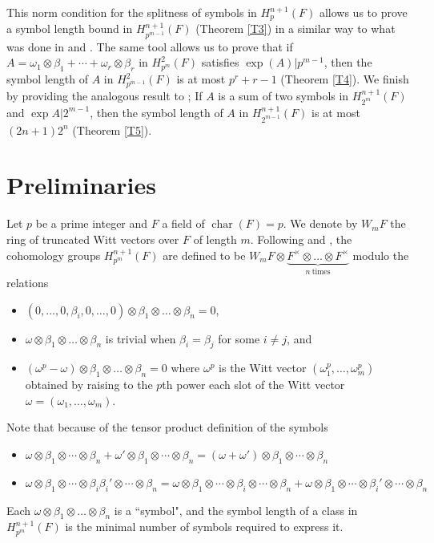 \documentclass[preprint, 10pt, english]{elsarticle}
\theoremstyle{definition}
\begin{document}
This norm condition for the splitness of symbols in $H_p^{n+1}(F)$ allows us to prove a symbol length bound in $H^{n+1}_{p^{m-1}}(F)$ (Theorem \ref{T3}) in a similar way to what was done in \cite{ChapmanMcKinnie:2023} and \cite{ChapmanFlorenceMcKinnie:2023}. The same tool allows us to prove that if $A=\omega_1\otimes \beta_1+\cdots+\omega_r\otimes \beta_r$ in $H_{p^{m}}^2(F)$ satisfies $\exp(A)|p^{m-1}$, then the symbol length of $A$ in $H_{p^{m-1}}^2(F)$ is at most $p^r+r-1$ (Theorem \ref{T4}).
We finish by providing the analogous result to \cite[Section 9]{Matzri:2024}; If $A$ is a sum of two symbols in $H_{2^m}^{n+1}(F)$ and $\exp A |2^{m-1}$, then the symbol length of $A$ in $H_{2^{m-1}}^{n+1}(F)$ is at most $(2n+1)2^n$ (Theorem \ref{T5}).
\section{Preliminaries}

Let $p$ be a prime integer and $F$ a field of $\operatorname{char}(F)= p$.
We denote by $W_mF$ the ring of truncated Witt vectors over $F$ of length $m$.
Following \cite{Izhboldin:2000} and \cite{AravireJacobORyan:2018}, the cohomology groups $H_{p^m}^{n+1}(F)$ are defined to be $W_m F\otimes \underbrace{F^\times \otimes \dots \otimes F^\times}_{n \ \text{times}}$ modulo the relations 
\begin{itemize}
\item $(0,\dots,0,\beta_i,0,\dots,0) \otimes \beta_1 \otimes \dots \otimes \beta_n=0$, 
\item $\omega \otimes \beta_1 \otimes \dots \otimes \beta_n$ is trivial when $\beta_i=\beta_j$ for some $i \neq j$, and 
\item $(\omega^p-\omega) \otimes \beta_1 \otimes \dots \otimes \beta_n=0$ where $\omega^p$ is the Witt vector $(\omega_1^p,\dots,\omega_m^p)$ obtained by raising to the $p$th power each slot of the Witt vector $\omega=(\omega_1,\dots,\omega_m)$.
\end{itemize}

Note that because of the tensor product definition of the symbols
\begin{itemize}
\item $\omega \otimes \beta_1\otimes \cdots \otimes \beta_n + \omega' \otimes \beta_1\otimes \cdots \otimes \beta_n =
(\omega + \omega') \otimes \beta_1\otimes \cdots \otimes \beta_n$
\item $\omega \otimes \beta_1\otimes\cdots \otimes \beta_i\beta_i'\otimes \cdots \otimes \beta_n = 
\omega \otimes \beta_1\otimes\cdots \otimes \beta_i \otimes \cdots \otimes \beta_n + 
\omega \otimes \beta_1\otimes\cdots \otimes \beta_i' \otimes \cdots \otimes \beta_n$
\end{itemize}
Each $\omega \otimes \beta_1 \otimes \dots \otimes \beta_n$ is a ``symbol", and the symbol length of a class in $H^{n+1}_{p^m}(F)$ is the minimal number of symbols required to express it.
\end{document}
